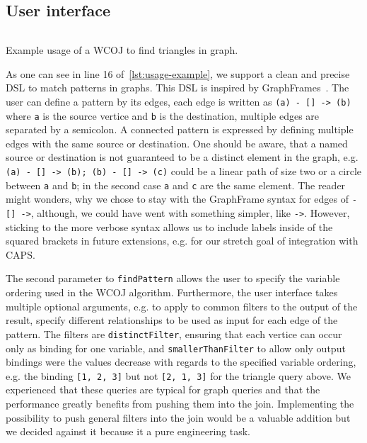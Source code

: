 \subsection{User interface}\label{subsec:user-interface}
\begin{listing}[H]
    \inputminted{scala}{code/usage-example.scala}
    \caption{Example usage of a WCOJ to find triangles in graph.}
    \label{lst:usage-example}
\end{listing}

As one can see in line 16 %
of~\cref{lst:usage-example}, we support a clean and precise DSL to match patterns in graphs.
This DSL is inspired by GraphFrames~\cite{graph-frames}.
The user can define a pattern by its edges, each edge is written as \texttt{(a) - [] -> (b)} where \texttt{a} is the
source vertice and \texttt{b} is the destination, multiple edges are separated by a semicolon.
A connected pattern is expressed by defining multiple edges with the same source or destination.
One should be aware, that a named source or destination is not guaranteed to be a distinct element in the graph,
e.g. \texttt{(a) - [] -> (b); (b) - [] -> (c)} could be a linear path of size two or a circle between \texttt{a} and
\texttt{b}; in the second case \texttt{a} and \texttt{c} are the same element.
The reader might wonders, why we chose to stay with the GraphFrame syntax for edges of
\texttt{- [] ->}, although, we could have went with something simpler, like \texttt{->}.
However, sticking to the more verbose syntax allows us to include labels inside of the squared brackets
in future extensions, e.g. for our stretch goal of integration with CAPS.

The second parameter to \texttt{findPattern} allows the user to specify the variable ordering used in the WCOJ algorithm.
Furthermore, the user interface takes multiple optional arguments, e.g. to apply to common filters to the output of the result,
specify different relationships to be used as input for each edge of the pattern.
The filters are \texttt{distinctFilter}, ensuring that each vertice can occur only as binding for one variable, and
\texttt{smallerThanFilter} to allow only output bindings were the values decrease with regards to the specified variable ordering,
e.g. the binding \texttt{[1, 2, 3]} but not \texttt{[2, 1, 3]} for the triangle query above.
We experienced that these queries are typical for graph queries and that the performance greatly benefits from pushing
them into the join.
Implementing the possibility to push general filters into the join would be a valuable addition but we decided against it because
it a pure engineering task.


